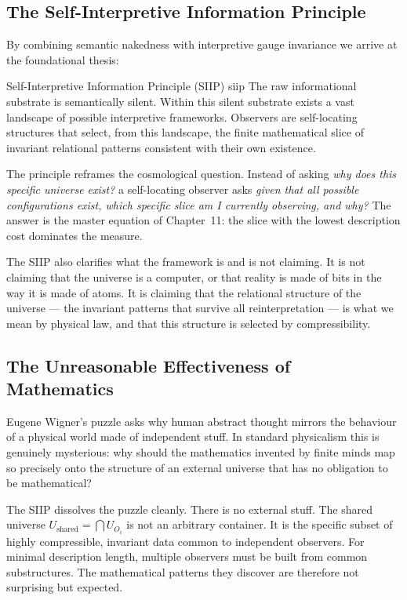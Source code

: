 \subsection*{The Self-Interpretive Information Principle}

By combining semantic nakedness with interpretive gauge invariance we
arrive at the foundational thesis:

\begin{principle}{Self-Interpretive Information Principle (SIIP)}
{siip}
The raw informational substrate is semantically silent. Within this
silent substrate exists a vast landscape of possible interpretive
frameworks. Observers are self-locating structures that select, from
this landscape, the finite mathematical slice of invariant relational
patterns consistent with their own existence.
\end{principle}

The principle reframes the cosmological question. Instead of asking
\emph{why does this specific universe exist?} a self-locating observer
asks \emph{given that all possible configurations exist, which specific
slice am I currently observing, and why?} The answer is the master
equation of Chapter~11: the slice with the lowest description cost
dominates the measure.

The SIIP also clarifies what the framework is and is not claiming. It
is not claiming that the universe is a computer, or that reality is
made of bits in the way it is made of atoms. It is claiming that the
relational structure of the universe --- the invariant patterns that
survive all reinterpretation --- is what we mean by physical law, and
that this structure is selected by compressibility.


\subsection*{The Unreasonable Effectiveness of Mathematics}

Eugene Wigner's puzzle asks why human abstract thought mirrors the
behaviour of a physical world made of independent stuff. In standard
physicalism this is genuinely mysterious: why should the mathematics
invented by finite minds map so precisely onto the structure of an
external universe that has no obligation to be mathematical?

The SIIP dissolves the puzzle cleanly. There is no external stuff. The
shared universe $U_{\mathrm{shared}} = \bigcap U_{O_i}$ is not an
arbitrary container. It is the specific subset of highly compressible,
invariant data common to independent observers. For minimal
description length, multiple observers must be built from common
substructures. The mathematical patterns they discover are therefore not
surprising but expected.


